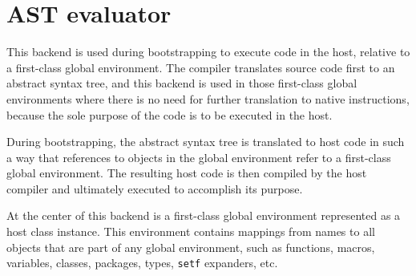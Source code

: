 \chapter{AST evaluator}

This backend is used during bootstrapping to execute \sysname{} code
in the host, relative to a \sysname{} first-class global environment.
The compiler translates source code first to an abstract syntax tree,
and this backend is used in those first-class global environments
where there is no need for further translation to native instructions,
because the sole purpose of the code is to be executed in the host.

During bootstrapping, the abstract syntax tree is translated to host
code in such a way that references to objects in the global
environment refer to a first-class global environment.  The resulting
host code is then compiled by the host compiler and ultimately
executed to accomplish its purpose.

At the center of this backend is a \sysname{} first-class global
environment represented as a host class instance.  This environment
contains mappings from names to all objects that are part of any
global environment, such as functions, macros, variables, classes,
packages, types, \texttt{setf} expanders, etc.
